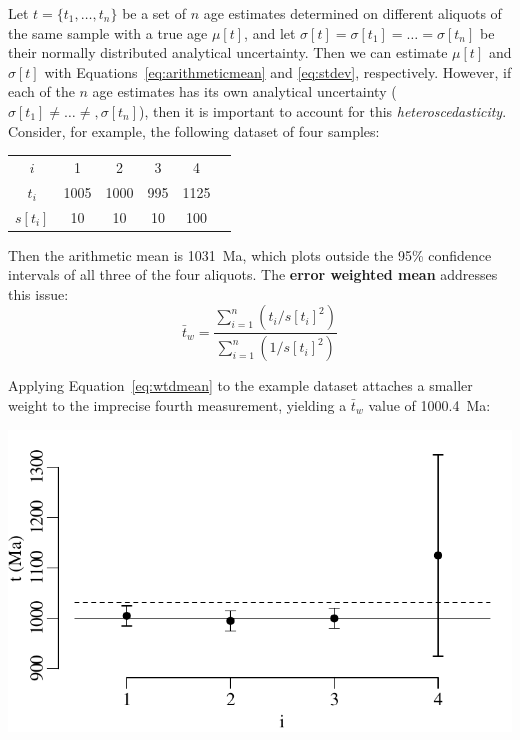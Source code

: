 \begin{refsection}
Let $t = \{t_1, \ldots, t_n\}$ be a set of $n$ age estimates
determined on different aliquots of the same sample with a true age
$\mu[t]$, and let $\sigma[t] = \sigma[t_1] = \ldots = \sigma[t_n]$ be
their normally distributed analytical uncertainty. Then we can
estimate $\mu[t]$ and $\sigma[t]$ with
Equations~\ref{eq:arithmeticmean} and \ref{eq:stdev}, respectively.
However, if each of the $n$ age estimates has its own analytical
uncertainty ($\sigma[t_1] \neq \ldots \neq, \sigma[t_n]$), then it is
important to account for this \textit{heteroscedasticity}. Consider,
for example, the following dataset of four samples:

\begin{center}
\begin{tabular}{c|ccccc}
  $i$ & 1 & 2 & 3 & 4 \\
$t_i$ & 1005 & 1000 & 995 & 1125 \\
$s[t_i]$ & 10 & 10 & 10 & 100
\end{tabular}
\label{tab:wtdmean}
\end{center}

Then the arithmetic mean is 1031~Ma, which plots outside the 95\%
confidence intervals of all three of the four aliquots. The
\textbf{error weighted mean} addresses this issue:
\begin{equation}
  \bar{t}_w = \frac{\sum_{i=1}^n (t_i/s[t_i]^2) }{\sum_{i=1}^n (1/s[t_i]^2) }
  \label{eq:wtdmean}
\end{equation}

Applying Equation~\ref{eq:wtdmean} to the example dataset attaches a
smaller weight to the imprecise fourth measurement, yielding a
$\bar{t}_w$ value of 1000.4~Ma:

\noindent\begin{minipage}[t]{.5\textwidth}
\strut\vspace*{-\baselineskip}\newline
\includegraphics[width=\textwidth]{../figures/wtdmean.pdf}
\end{minipage}
\begin{minipage}[t]{.5\textwidth}
  \label{fig:wtdmean}
\end{minipage}


\end{refsection}
